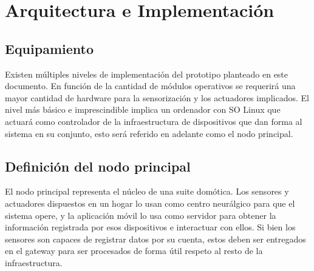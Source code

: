 \cleardoublepage

\chapter{Arquitectura e Implementación}
\label{makereference4}

\section{Equipamiento}
\label{makereference4.1}

Existen múltiples niveles de implementación del prototipo planteado en este documento. En función de la cantidad de módulos operativos se requerirá una mayor cantidad de hardware para la sensorización y los actuadores implicados. El nivel más básico e imprescindible implica un ordenador con SO Linux que actuará como controlador de la infraestructura de dispositivos que dan forma al sistema en su conjunto, esto será referido en adelante como el nodo principal.

\section{Definición del nodo principal}
\label{makereference4.2}

El nodo principal representa el núcleo de una suite domótica. Los sensores y actuadores dispuestos en un hogar lo usan como centro neurálgico para que el sistema opere, y la aplicación móvil lo usa como servidor para obtener la información registrada por esos dispositivos e interactuar con ellos. Si bien los sensores son capaces de registrar datos por su cuenta, estos deben ser entregados en el \gls{gateway} para ser procesados de forma útil respeto al resto de la infraestructura. 

\vspace{1cm}

